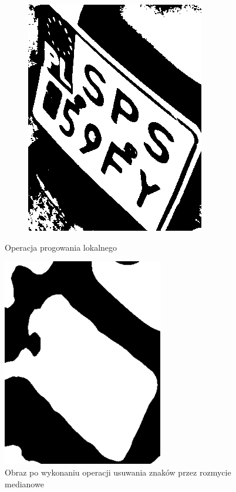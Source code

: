 \begin{figure}
\begin{subfigure}[b]{0.45\textwidth}
    \includegraphics[width=\textwidth]{img/detect-bg-bad-output}
    \label{fig:detect_bg_bad_output}
    \caption{}
  \end{subfigure}
  \caption{Operacja progowania lokalnego}
  \label{fig:detect_bg_bad}
\end{figure}

\begin{figure}
  \centering
  \includegraphics[width=7cm]{img/detect-bg-ok-output}
  \caption{Obraz po wykonaniu operacji usuwania znaków przez rozmycie medianowe}
  \label{fig:detect_bg_ok}
\end{figure}

